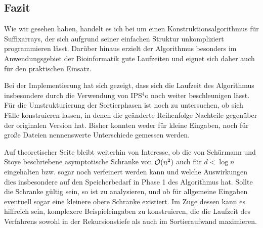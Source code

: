 \subsection{Fazit}
\label{bpr:fazit}

Wie wir gesehen haben, handelt es ich bei \bpr um einen Konstruktionsalgorithmus für Suffixarrays, der sich aufgrund seiner einfachen Struktur unkompliziert programmieren lässt. Darüber hinaus erzielt der Algorithmus besonders im Anwendungsgebiet der Bioinformatik gute Laufzeiten und eignet sich daher auch für den praktischen Einsatz.\par
Bei der Implementierung hat sich gezeigt, dass sich die Laufzeit des Algorithmus insbesondere durch die Verwendung von IPS\(^4\)o noch weiter beschleunigen lässt. Für die Umstrukturierung der Sortierphasen ist noch zu untersuchen, ob sich Fälle konstruieren lassen, in denen die geänderte Reihenfolge Nachteile gegenüber der originalen Version hat. Bisher konnten weder für kleine Eingaben, noch für große Dateien nennenswerte Unterschiede gemessen werden.\par\smallskip
Auf theoretischer Seite bleibt weiterhin von Interesse, ob die von Schürmann und Stoye beschriebene asymptotische Schranke von \(\mathcal{O}(n^2)\) \cite[Kapitel~5]{schuermann2005} auch für \(d < \log n\) eingehalten bzw. sogar noch verfeinert werden kann und welche Auswirkungen dies insbesondere auf den Speicherbedarf in Phase 1 des Algorithmus hat. Sollte die Schranke gültig sein, so ist zu analysieren, und ob für allgemeine Eingaben eventuell sogar eine kleinere obere Schranke existiert. Im Zuge dessen kann es hilfreich sein, komplexere Beispieleingaben zu konstruieren, die die Laufzeit des Verfahrens sowohl in der Rekursionstiefe als auch im Sortieraufwand maximieren.
